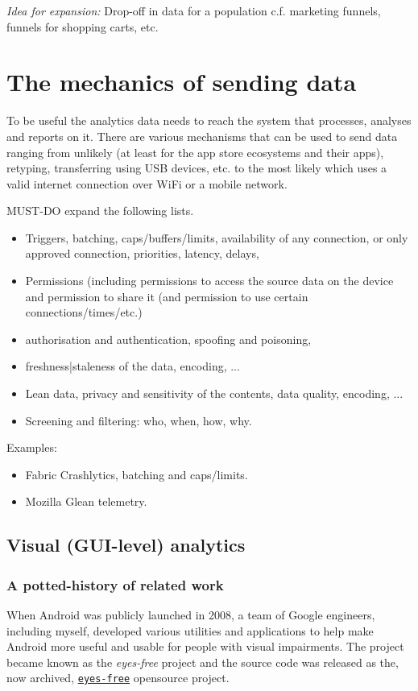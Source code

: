 \emph{Idea for expansion:} Drop-off in data for a population  c.f. marketing funnels, funnels for shopping carts, etc.


\section{The mechanics of sending data}
To be useful the analytics data needs to reach the system that processes, analyses and reports on it. There are various mechanisms that can be used to send data ranging from unlikely (at least for the app store ecosystems and their apps), retyping, transferring using USB devices, etc. to the most likely which uses a valid internet connection over WiFi or a mobile network. 

MUST-DO expand the following lists.
\begin{itemize}
    \item Triggers, batching, caps/buffers/limits, availability of any connection, or only approved connection, priorities, latency, delays,
    \item Permissions (including permissions to access the source data on the device and permission to share it (and permission to use certain connections/times/etc.)
    \item authorisation and authentication, spoofing and poisoning,
    \item freshness|staleness of the data, encoding, ...
    \item Lean data, privacy and sensitivity of the contents, data quality, encoding, ...
    \item Screening and filtering: who, when, how, why.
\end{itemize}

Examples:
\begin{itemize}
    \item Fabric Crashlytics, batching and caps/limits.
    \item Mozilla Glean telemetry.
\end{itemize}


\subsection{Visual (GUI-level) analytics}

\subsubsection{A potted-history of related work}
When Android was publicly launched in 2008, a team of Google engineers, including myself, developed various utilities and applications to help make Android more useful and usable for people with visual impairments. The project became known as the \emph{eyes-free} project and the source code was released as the, now archived, \href{https://code.google.com/archive/p/eyes-free/}{\texttt{eyes-free}} opensource project. 

